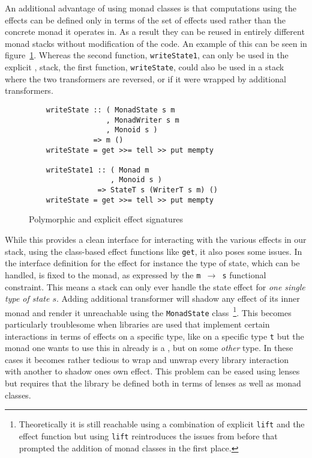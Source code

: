 An additional advantage of using monad classes is that computations
using the effects can be defined only in terms of the set of effects
used rather than the concrete monad it operates in. As a result they
can be reused in entirely different monad stacks without modification
of the code. An example of this can be seen in
figure~\ref{fig:monad-class-poly}. Whereas the second function,
\texttt{writeState1}, can only be used in the explicit \StateT{},
\WriterT{} stack, the first function, \texttt{writeState}, could also
be used in a stack where the two transformers are reversed, or if it
were wrapped by additional transformers.

\begin{figure}
  \begin{lstlisting}
    writeState :: ( MonadState s m
                  , MonadWriter s m
                  , Monoid s )
               => m ()
    writeState = get >>= tell >> put mempty

    writeState1 :: ( Monad m
                   , Monoid s )
                => StateT s (WriterT s m) ()
    writeState = get >>= tell >> put mempty
  \end{lstlisting}
  \caption{Polymorphic and explicit effect signatures}
  \label{fig:monad-class-poly}
\end{figure}
  
While this provides a clean interface for interacting with the various
effects in our stack, using the class-based effect functions like
\texttt{get}, it also poses some issues. In the interface definition
for the \StateM{} effect for instance the type of state, which can be
handled, is fixed to the monad, as expressed by the \texttt{m
  $\rightarrow$ s} functional constraint. This means a stack can only
ever handle the state effect for \emph{one single type of state
  $s$}. Adding additional \StateT{} transformer will shadow any
\StateM{} effect of its inner monad and render it unreachable using
the \texttt{MonadState} class~\footnote{Theoretically it is still
  reachable using a combination of explicit \texttt{lift} and the
  effect function but using \texttt{lift} reintroduces the issues from
  before that prompted the addition of monad classes in the first
  place.}. This becomes particularly troublesome when libraries are
used that implement certain interactions in terms of effects on a
specific type, like \ReaderM{} on a specific type \texttt{t} but the
monad one wants to use this in already is a \ReaderM{}, but on some
\emph{other} type. In these cases it becomes rather tedious to wrap
and unwrap every library interaction with another \ReaderT{} to shadow
ones own \ReaderM{} effect. This problem can be eased using lenses but
requires that the library be defined both in terms of lenses as well
as monad classes.

